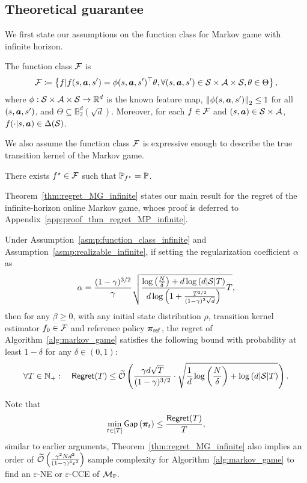 
\subsection{Theoretical guarantee}\label{sec:markov_analysis_infinite}

We first state our assumptions on the function class for Markov game with infinite horizon.

\begin{asmp}\label{asmp:function_class_infinite}
    The function class ${\mathcal{F}}$ is
    $${\mathcal{F}}\coloneqq\left\{f|f(s,{\bm{a}},s')=\phi(s,{\bm{a}},s')^\top\theta,\forall (s,{\bm{a}},s')\in{\mathcal{S}}\times{\mathcal{A}}\times{\mathcal{S}},\theta\in\Theta\right\},$$
    where $\phi:{\mathcal{S}}\times{\mathcal{A}}\times{\mathcal{S}}\rightarrow\mathbb{R}^d$ is the known feature map, $\left\| \phi(s,{\bm{a}},s') \right\|_2\leq 1$ for all $(s,{\bm{a}},s')$, and $\Theta\subseteq\mathbb{B}^d_2(\sqrt{d})$. Moreover,  for each $f\in{\mathcal{F}}$ and $(s,{\bm{a}})\in{\mathcal{S}}\times{\mathcal{A}}$, $f(\cdot|s,{\bm{a}})\in\Delta({\mathcal{S}})$.
\end{asmp}
We also assume the function class ${\mathcal{F}}$ is expressive enough to describe the true transition kernel of the Markov game.
\begin{asmp}[realizability]\label{asmp:realizable_infinite}
    There exists $f^\star\in{\mathcal{F}}$ such that ${\mathbb P}_{f^\star}={\mathbb P}$.
\end{asmp}

Theorem~\ref{thm:regret_MG_infinite} states our main result for the regret of the infinite-horizon online Markov game, whoes proof is deferred to Appendix~\ref{app:proof_thm_regret_MP_infinite}.

\begin{thm}\label{thm:regret_MG_infinite}
    Under Assumption~\ref{asmp:function_class_infinite} and Assumption~\ref{asmp:realizable_infinite}, if setting the regularization coefficient $\alpha$ as
    $$\alpha = \frac{(1-\gamma)^{3/2}}{\gamma}\sqrt{\frac{\log\left(\frac{N}{\delta}\right) + d\log\left(d|{\mathcal{S}}|T\right)}{d\log\left(1+\frac{T^{3/2}}{(1-\gamma)^2\sqrt{d}}\right)}T},$$
    then for any $\beta\geq 0$, with any initial state distribution $\rho$, transition kernel estimator $f_0\in{\mathcal{F}}$ and reference policy ${\bm{\pi}}_{\mathsf{ref}}$, the regret of Algorithm~\ref{alg:markov_game} satisfies the following bound with probability at least $1-\delta$ for any $\delta\in(0,1)$:
    \begin{align}\label{eq:regret_MG_bd_infinite}
        \forall T\in{\mathbb N}_+:\quad\mathsf{Regret}(T)\leq \widetilde{{\mathcal{O}}}\left( \frac{\gamma d\sqrt{T}}{(1-\gamma)^{3/2}}\cdot \sqrt{\frac{1}{d}\log\left(\frac{N}{\delta}\right) + \log\left(d|{\mathcal{S}}|T\right)}\right).
    \end{align}
\end{thm}

Note that
\begin{align}
    \min_{t\in[T]}\mathsf{Gap}\left({\bm{\pi}}_t\right)\leq \frac{\mathsf{Regret}(T)}{T},
\end{align}
similar to earlier arguments, Theorem~\ref{thm:regret_MG_infinite} also implies an order of $\widetilde{{\mathcal{O}}}\left(\frac{\gamma^2 N d^2}{(1-\gamma)^4 \varepsilon^2}\right)$ sample complexity for Algorithm~\ref{alg:markov_game} to find an $\varepsilon$-NE or $\varepsilon$-CCE of ${\mathcal{M}}_{\mathbb P}$.
 
